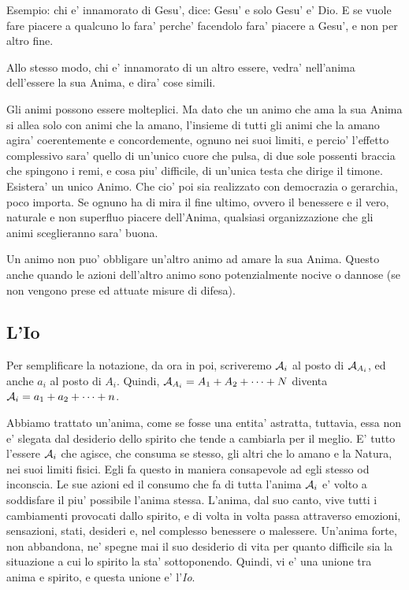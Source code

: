 Esempio: chi e' innamorato di Gesu', dice: Gesu' e solo Gesu' e' Dio. E se vuole fare piacere a qualcuno lo fara' perche' facendolo fara' piacere a Gesu', e non per altro fine. 

Allo stesso modo, chi e' innamorato di un altro essere, vedra' nell'anima dell'essere la sua Anima, e dira' cose simili.

Gli animi possono essere molteplici. Ma dato che un animo che ama la sua Anima si allea solo con animi che la amano, l'insieme di tutti gli animi che la amano agira' coerentemente e concordemente, ognuno nei suoi limiti, e percio' l'effetto complessivo sara' quello di un'unico cuore che pulsa, di due sole possenti braccia che spingono i remi, e cosa piu' difficile, di un'unica testa che dirige il timone. Esistera' un unico Animo. Che cio' poi sia realizzato con democrazia o gerarchia, poco importa. Se ognuno ha di mira il fine ultimo, ovvero il benessere e il vero, naturale e non superfluo piacere dell'Anima, qualsiasi organizzazione che gli animi sceglieranno sara' buona.

Un animo non puo' obbligare un'altro animo ad amare la sua Anima. Questo anche quando le azioni dell'altro animo sono potenzialmente nocive o dannose (se non vengono prese ed attuate misure di difesa).


\def\Dio{D}


\subsection{L'Io}

Per semplificare la notazione, da ora in poi, scriveremo $\mathcal{A}_i$ al posto di $\mathcal{A}_{A_i}$, ed anche $a_i$ al posto di $A_i$. Quindi, $\mathcal{A}_{A_i}=A_1+A_2+\cdots+N$ diventa $\mathcal{A}_i=a_1+a_2+\cdots+n$. %

\def\Io{\textrm{Io}}

\def\esAi{\anima{A}_i}
\def\esAj{\anima{A}_j}
\def\esAE{\anima{A}_E}

    Abbiamo trattato un'anima, come se fosse una entita' astratta, tuttavia, essa non e' slegata dal desiderio dello spirito che tende a cambiarla per il meglio. E' tutto l'essere $\esAi$ che agisce, che consuma se stesso, gli altri che lo amano e la Natura, nei suoi limiti fisici. Egli fa questo in maniera consapevole ad egli stesso od inconscia. Le sue azioni ed il consumo che fa di tutta l'anima $\esAi$ e' volto a soddisfare il piu' possibile l'anima stessa. L'anima, dal suo canto, vive tutti i cambiamenti provocati dallo spirito, e di volta in volta passa attraverso emozioni, sensazioni, stati, desideri e, nel complesso benessere o malessere. Un'anima forte, non abbandona, ne' spegne mai il suo desiderio di vita per quanto difficile sia la situazione a cui lo spirito la sta' sottoponendo. Quindi, vi e' una unione tra anima e spirito, e questa unione e' l'\emph{Io}.

